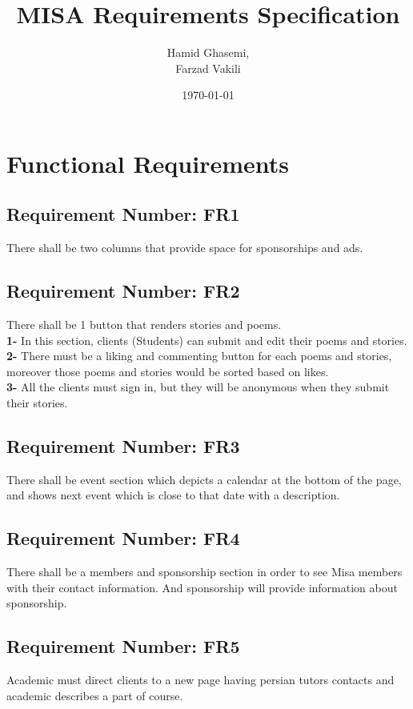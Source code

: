 \documentclass[12pt, titlepage]{article}
\title{MISA Requirements Specification }
\author{Hamid Ghasemi,\\
		Farzad Vakili
}
\date{\today}
\begin{document}
\maketitle
\newpage
{}



\section{Functional Requirements}

\subsection{Requirement Number: FR1}
There shall be two columns that provide space for sponsorships and ads.

\subsection{Requirement Number: FR2}
There shall be 1 button that renders stories and poems.\\
\indent \textbf{1-} In this section, clients (Students) can submit and edit their poems and \indent stories.\\
\indent \textbf{2-} There must be a liking and commenting button for each poems and \indent stories, moreover those poems and stories would be sorted based on likes.\\
\indent \textbf{3-} All the clients must sign in, but they will be anonymous when they \indent submit their stories.\\

\subsection{Requirement Number: FR3}
There shall be event section which depicts a calendar at the bottom of the page, and shows next event which is close to that date with a description.

\subsection{Requirement Number: FR4}
There shall be a members and sponsorship section in order to see Misa members with their contact information. And sponsorship will provide information about sponsorship.

\subsection{Requirement Number: FR5}
Academic must direct clients to a new page having persian tutors contacts and academic describes a part of course.
\end{document}

